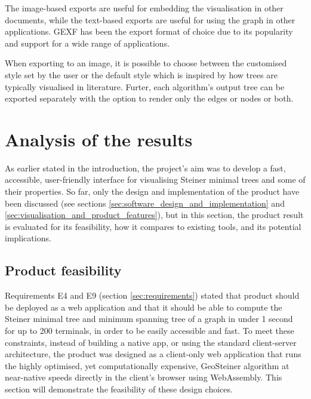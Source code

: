 \documentclass{l4proj}
\begin{document}
The image-based exports are useful for embedding the visualisation in other documents, while the text-based exports are useful for using the graph in other applications. GEXF has been the export format of choice due to its popularity and support for a wide range of applications.

When exporting to an image, it is possible to choose between the customised style set by the user or the default style which is inspired by how trees are typically visualised in literature. Furter, each algorithm's output tree can be exported separately with the option to render only the edges or nodes or both.




\chapter{Analysis of the results}
\label{sec:analysis_results}
As earlier stated in the introduction, the project's aim was to develop a fast, accessible, user-friendly interface for visualising Steiner minimal trees and some of their properties.
So far, only the design and implementation of the product have been discussed (see sections \ref{sec:software_design_and_implementation} and \ref{sec:visualisation_and_product_features}), but in this section, the product result is evaluated for its feasibility, how it compares to existing tools, and its potential implications.

\section{Product feasibility}
Requirements E4 and E9 (section \ref{sec:requirements}) stated that product should be deployed as a web application and that it should be able to compute the Steiner minimal tree and minimum spanning tree of a graph in under 1 second for up to 200 terminals, in order to be easily accessible and fast. To meet these constraints, instead of building a native app, or using the standard client-server architecture, the product was designed as a client-only web application that runs the highly optimised, yet computationally expensive, GeoSteiner algorithm at near-native speeds directly in the client's browser using WebAssembly.
This section will demonstrate the feasibility of these design choices.
\end{document}
